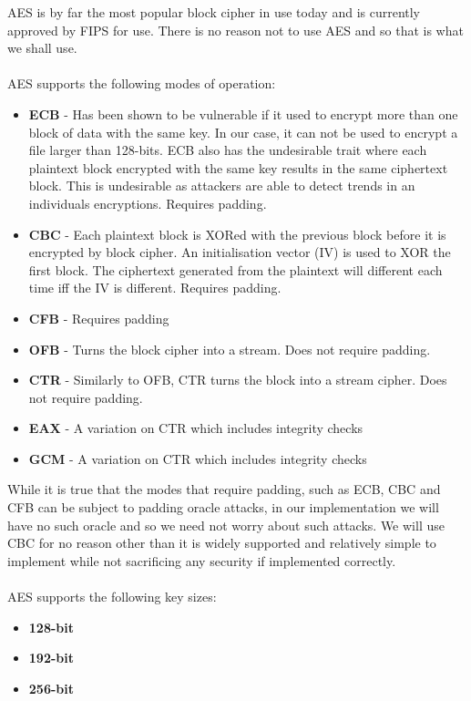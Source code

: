 \documentclass[12pt, titlepage]{article}
\begin{document}
AES is by far the most popular block cipher in use today and is currently approved by FIPS for use.\cite{aesFIPSApproved}
There is no reason not to use AES and so that is what we shall use.
\\
\\
AES supports the following modes of operation:\cite{aesModes}
\begin{itemize}
	\item \textbf{ECB} - Has been shown to be vulnerable if it used to encrypt more than one block of data with the same key. In our case, it can not be used to encrypt a file larger than 128-bits. ECB also has the undesirable trait where each plaintext block encrypted with the same key results in the same ciphertext block. This is undesirable as attackers are able to detect trends in an individuals encryptions. Requires padding.
	\item \textbf{CBC} - Each plaintext block is XORed with the previous block before it is encrypted by block cipher. An initialisation vector (IV) is used to XOR the first block. The ciphertext generated from the plaintext will different each time iff the IV is different. Requires padding.
	\item \textbf{CFB} - Requires padding
	\item \textbf{OFB} - Turns the block cipher into a stream. Does not require padding.
	\item \textbf{CTR} - Similarly to OFB, CTR turns the block into a stream cipher. Does not require padding.
	\item \textbf{EAX} - A variation on CTR which includes integrity checks
	\item \textbf{GCM} - A variation on CTR which includes integrity checks
\end{itemize}
While it is true that the modes that require padding, such as ECB, CBC and CFB can be subject to padding oracle attacks, in our implementation we will have no such oracle and so we need not worry about such attacks.\cite{oraclePadding}
\newline We will use CBC for no reason other than it is widely supported and relatively simple to implement while not sacrificing any security if implemented correctly.
\\
\\
AES supports the following key sizes:
\begin{itemize}
	\item \textbf{128-bit}
	\item \textbf{192-bit}
	\item \textbf{256-bit}
\end{itemize}
\end{document}
